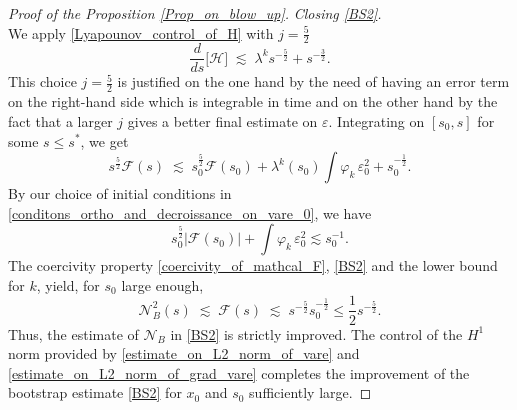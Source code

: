 \documentclass[10pt,a4paper]{amsart}
\newcommand{\vare}{{\varepsilon}}
\newcommand{\vphi}{{\varphi}}
\begin{document}
\begin{proof}[Proof of the Proposition \ref{Prop_on_blow_up}]
\vspace{0.2cm}
\textit{Closing \eqref{BS2}.}\\
We apply \eqref{Lyapounov_control_of_H} with $j= \frac{5}{2}$ 
\begin{equation}
    \frac{d}{ds}\big[ \mathcal{H} \big] \;\lesssim\;  \lambda^k s^{-\frac 52} + s^{-\frac{3}{2}}.
\end{equation}
This choice $j=\frac 52$ is justified on the one hand by the need of having an error term on the 
right-hand side which is integrable in time and on the other hand by the fact that
a larger $j$ gives a better final estimate on $\vare$.
Integrating on $[s_0,s]$ for some $s\leq s^*$, we get
\begin{equation}
    s^{\frac{5}{2}}\mathcal{F}(s) \;\lesssim\; s^{\frac{5}{2}}_0 \mathcal{F}(s_0) + \lambda^k(s_0) \int \vphi_k\,\vare^2_0 + s_0^{-\frac 12}.
\end{equation}
By our choice of initial conditions in \eqref{conditons_ortho_and_decroissance_on_vare_0}, we have 
\begin{equation}
    s_0^\frac52\big| \mathcal{F}(s_0)\big| + \int \vphi_k\,\vare^2_0  \lesssim s_0^{-1}.
\end{equation}
The coercivity property \eqref{coercivity_of_mathcal_F}, \eqref{BS2} and the lower bound for $k$, yield, for $s_0$ large enough,
\begin{equation}
    \mathcal{N}^2_B(s) \;\lesssim\; \mathcal{F}(s)  \;\lesssim\; s^{-\frac 52}s_0^{-\frac12}
    \leq \frac12 s^{-\frac 52}.
\end{equation}
Thus, the estimate of $\mathcal{N}_B$ in \eqref{BS2} is strictly improved.
The control of the $H^1$ norm provided by \eqref{estimate_on_L2_norm_of_vare} and \eqref{estimate_on_L2_norm_of_grad_vare} completes the improvement of the
bootstrap estimate \eqref{BS2} for $x_0$ and $s_0$ sufficiently large.



\end{proof}
\end{document}
